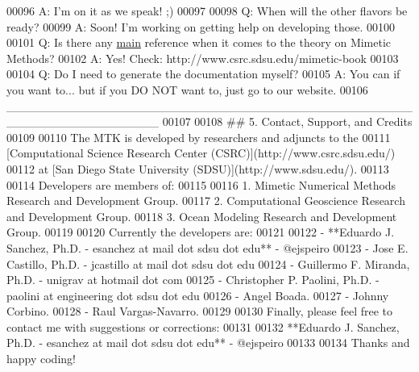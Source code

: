 \begin{DoxyCode}
00096 A: I\textcolor{stringliteral}{'m on it as we speak! ;)}
00097 \textcolor{stringliteral}{}
00098 \textcolor{stringliteral}{Q: When will the other flavors be ready?}
00099 \textcolor{stringliteral}{A: Soon! I'}m working on getting help on developing those.
00100 
00101 Q: Is there any \hyperlink{mtk__blas__adapter__test_8cc_ae66f6b31b5ad750f1fe042a706a4e3d4}{main} reference when it comes to the theory on Mimetic Methods?
00102 A: Yes! Check: http:\textcolor{comment}{//www.csrc.sdsu.edu/mimetic-book}
00103 
00104 Q: Do I need to generate the documentation myself?
00105 A: You can \textcolor{keywordflow}{if} you want to... but \textcolor{keywordflow}{if} you DO NOT want to, just go to our website.
00106     \_\_\_\_\_\_\_\_\_\_\_\_\_\_\_\_\_\_\_\_\_\_\_\_\_\_\_\_\_\_\_\_\_\_\_\_\_\_\_\_\_\_\_\_\_\_\_\_\_\_\_\_\_\_\_\_\_\_\_\_\_\_\_\_\_\_
00107 
00108 \textcolor{preprocessor}{## 5. Contact, Support, and Credits}
00109 \textcolor{preprocessor}{}
00110 The MTK is developed by researchers and adjuncts to the
00111 [Computational Science Research Center (CSRC)](http:\textcolor{comment}{//www.csrc.sdsu.edu/)}
00112 at [San Diego State University (SDSU)](http:\textcolor{comment}{//www.sdsu.edu/).}
00113 
00114 Developers are members of:
00115 
00116 1. Mimetic Numerical Methods Research and Development Group.
00117 2. Computational Geoscience Research and Development Group.
00118 3. Ocean Modeling Research and Development Group.
00119 
00120 Currently the developers are:
00121 
00122 - **Eduardo J. Sanchez, Ph.D. - esanchez at mail dot sdsu dot edu** - @ejspeiro
00123 - Jose E. Castillo, Ph.D. - jcastillo at mail dot sdsu dot edu
00124 - Guillermo F. Miranda, Ph.D. - unigrav at hotmail dot com
00125 - Christopher P. Paolini, Ph.D. - paolini at engineering dot sdsu dot edu
00126 - Angel Boada.
00127 - Johnny Corbino.
00128 - Raul Vargas-Navarro.
00129 
00130 Finally, please feel free to contact me with suggestions or corrections:
00131 
00132 **Eduardo J. Sanchez, Ph.D. - esanchez at mail dot sdsu dot edu** - @ejspeiro
00133 
00134 Thanks and happy coding!
\end{DoxyCode}
